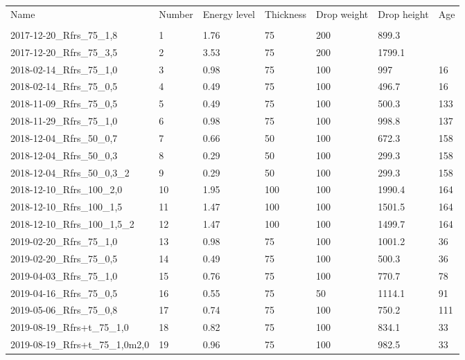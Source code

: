 \begin{tabular}{l l l l l l l}
\toprule
Name & Number & Energy level & Thickness & Drop weight & Drop height &  Age \\
                         &        &              &           &             &             &      \\
\midrule
2017-12-20\_Rfrs\_75\_1,8       &      1 &         1.76 &        75 &         200 &       899.3 &      \\
2017-12-20\_Rfrs\_75\_3,5       &      2 &         3.53 &        75 &         200 &      1799.1 &      \\
2018-02-14\_Rfrs\_75\_1,0       &      3 &         0.98 &        75 &         100 &         997 &   16 \\
2018-02-14\_Rfrs\_75\_0,5       &      4 &         0.49 &        75 &         100 &       496.7 &   16 \\
2018-11-09\_Rfrs\_75\_0,5       &      5 &         0.49 &        75 &         100 &       500.3 &  133 \\
2018-11-29\_Rfrs\_75\_1,0       &      6 &         0.98 &        75 &         100 &       998.8 &  137 \\
2018-12-04\_Rfrs\_50\_0,7       &      7 &         0.66 &        50 &         100 &       672.3 &  158 \\
2018-12-04\_Rfrs\_50\_0,3       &      8 &         0.29 &        50 &         100 &       299.3 &  158 \\
2018-12-04\_Rfrs\_50\_0,3\_2     &      9 &         0.29 &        50 &         100 &       299.3 &  158 \\
2018-12-10\_Rfrs\_100\_2,0      &     10 &         1.95 &       100 &         100 &      1990.4 &  164 \\
2018-12-10\_Rfrs\_100\_1,5      &     11 &         1.47 &       100 &         100 &      1501.5 &  164 \\
2018-12-10\_Rfrs\_100\_1,5\_2    &     12 &         1.47 &       100 &         100 &      1499.7 &  164 \\
2019-02-20\_Rfrs\_75\_1,0       &     13 &         0.98 &        75 &         100 &      1001.2 &   36 \\
2019-02-20\_Rfrs\_75\_0,5       &     14 &         0.49 &        75 &         100 &       500.3 &   36 \\
2019-04-03\_Rfrs\_75\_1,0       &     15 &         0.76 &        75 &         100 &       770.7 &   78 \\
2019-04-16\_Rfrs\_75\_0,5       &     16 &         0.55 &        75 &          50 &      1114.1 &   91 \\
2019-05-06\_Rfrs\_75\_0,8       &     17 &         0.74 &        75 &         100 &       750.2 &  111 \\
2019-08-19\_Rfrs+t\_75\_1,0     &     18 &         0.82 &        75 &         100 &       834.1 &   33 \\
2019-08-19\_Rfrs+t\_75\_1,0m2,0 &     19 &         0.96 &        75 &         100 &       982.5 &   33 \\
\bottomrule
\end{tabular}
